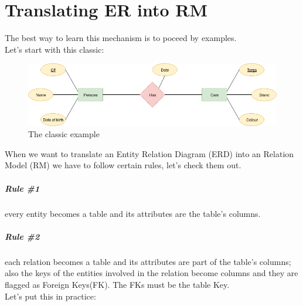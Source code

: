 \documentclass[class=book, crop=false, oneside]{standalone}
\begin{document}
\chapter*{Translating ER into RM}
The best way to learn this mechanism is to poceed by examples.\\
Let's start with this classic:

\begin{figure}[H]
	\centering
	\includegraphics[width=.9\textwidth,keepaspectratio]{diagram1_00.png}
	\caption{The classic example}
	\label{diagram1.00}
\end{figure}

When we want to translate an Entity Relation Diagram (ERD) into an Relation Model (RM) we have to follow certain rules, let's check them out.
\paragraph*{Rule \#1} every entity becomes a table and its attributes are the table's columns.
\paragraph*{Rule \#2} each relation becomes a table and its attributes are part of the table's columns; also the keys of the entities involved in the relation become columns and they are flagged as Foreign Keys(FK). The FKs must be the table Key.\\
Let's put this in practice:
\vskip 20pt
\end{document}
